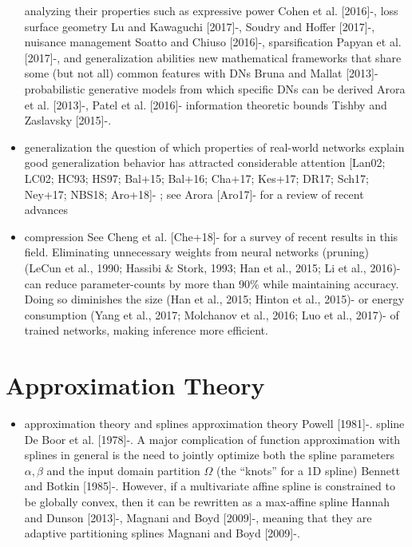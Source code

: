 \documentclass{article}
\begin{document}
\begin{itemize}
		\subitem analyzing their properties such as expressive power Cohen et al. [2016]-\cite{balestriero_mad_2018}, loss surface geometry Lu and Kawaguchi [2017]-\cite{balestriero_mad_2018}, Soudry and Hoffer [2017]-\cite{balestriero_mad_2018}, nuisance management Soatto and Chiuso [2016]-\cite{balestriero_mad_2018}, sparsification Papyan et al. [2017]-\cite{balestriero_mad_2018}, and generalization abilities
		\subitem new mathematical frameworks that share some (but not all) common features with DNs Bruna and Mallat [2013]-\cite{balestriero_mad_2018}
		\subitem probabilistic generative models from which specific DNs can be derived Arora et al. [2013]-\cite{balestriero_mad_2018}, Patel et al. [2016]-\cite{balestriero_mad_2018}
		\subitem information theoretic bounds Tishby and Zaslavsky [2015]-\cite{balestriero_mad_2018}.
	\item generalization
		\subitem the question of which properties of real-world networks explain good generalization behavior has attracted considerable attention [Lan02; LC02; HC93; HS97; Bal+15; Bal+16; Cha+17; Kes+17; DR17; Sch17; Ney+17; NBS18; Aro+18]-\cite{zhou_compressibility_2018} ; see Arora [Aro17]-\cite{zhou_compressibility_2018} for a review of recent advances
	\item compression
		\subitem  See Cheng et al. [Che+18]-\cite{zhou_compressibility_2018} for a survey of recent results in this field. Eliminating unnecessary weights from neural networks (pruning) (LeCun et al., 1990; Hassibi \& Stork, 1993; Han et al., 2015; Li et al., 2016)-\cite{frankle_lottery_2018} can reduce parameter-counts by more than 90\% while maintaining accuracy. Doing so diminishes the size (Han et al., 2015; Hinton et al., 2015)-\cite{frankle_lottery_2018} or energy consumption (Yang et al., 2017; Molchanov et al., 2016; Luo et al., 2017)-\cite{frankle_lottery_2018} of trained networks, making inference more efficient.
\end{itemize}


\section{Approximation Theory}

\begin{itemize}
	\item approximation theory and splines
		\subitem approximation theory Powell [1981]-\cite{balestriero_mad_2018}. spline De Boor et al. [1978]-\cite{balestriero_mad_2018}. A major complication of function approximation with splines in general is the need to jointly optimize both the spline parameters $\alpha, \beta$ and the input domain partition $\Omega$ (the ``knots'' for a 1D spline) Bennett and Botkin [1985]-\cite{balestriero_mad_2018}. However, if a multivariate affine spline is constrained to be globally convex, then it can be rewritten as a max-affine spline Hannah and Dunson [2013]-\cite{balestriero_mad_2018}, Magnani and Boyd [2009]-\cite{balestriero_mad_2018}, meaning that they are adaptive partitioning splines Magnani and Boyd [2009]-\cite{balestriero_mad_2018}.
\end{itemize}







\end{document}

